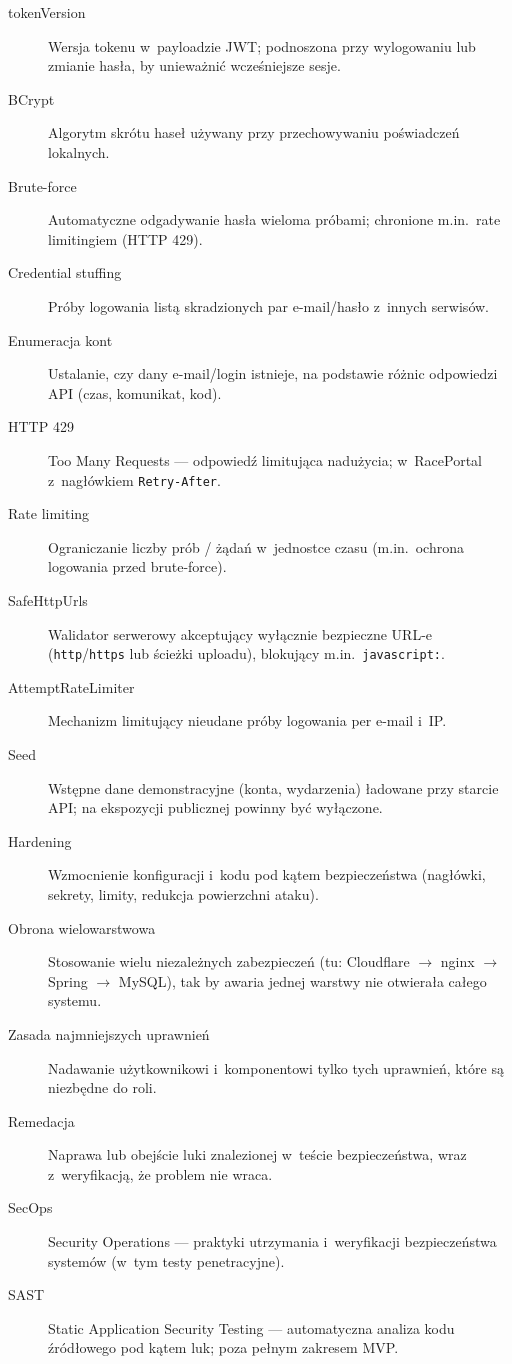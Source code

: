 \documentclass{sprz}
\begin{document}
\begin{description}
  \item[tokenVersion] Wersja tokenu w~payloadzie JWT; podnoszona przy wylogowaniu lub zmianie hasła, by unieważnić wcześniejsze sesje.
  \item[BCrypt] Algorytm skrótu haseł używany przy przechowywaniu poświadczeń lokalnych.
  \item[Brute-force] Automatyczne odgadywanie hasła wieloma próbami; chronione m.in.\ rate limitingiem (HTTP 429).
  \item[Credential stuffing] Próby logowania listą skradzionych par e-mail/hasło z~innych serwisów.
  \item[Enumeracja kont] Ustalanie, czy dany e-mail/login istnieje, na podstawie różnic odpowiedzi API (czas, komunikat, kod).
  \item[HTTP 429] Too Many Requests --- odpowiedź limitująca nadużycia; w~RacePortal z~nagłówkiem \texttt{Retry-After}.
  \item[Rate limiting] Ograniczanie liczby prób / żądań w~jednostce czasu (m.in.\ ochrona logowania przed brute-force).
  \item[SafeHttpUrls] Walidator serwerowy akceptujący wyłącznie bezpieczne URL-e (\texttt{http}/\texttt{https} lub ścieżki uploadu), blokujący m.in.\ \texttt{javascript:}.
  \item[AttemptRateLimiter] Mechanizm limitujący nieudane próby logowania per e-mail i~IP.
  \item[Seed] Wstępne dane demonstracyjne (konta, wydarzenia) ładowane przy starcie API; na ekspozycji publicznej powinny być wyłączone.
  \item[Hardening] Wzmocnienie konfiguracji i~kodu pod kątem bezpieczeństwa (nagłówki, sekrety, limity, redukcja powierzchni ataku).
  \item[Obrona wielowarstwowa] Stosowanie wielu niezależnych zabezpieczeń (tu: Cloudflare $\rightarrow$ nginx $\rightarrow$ Spring $\rightarrow$ MySQL), tak by awaria jednej warstwy nie otwierała całego systemu.
  \item[Zasada najmniejszych uprawnień] Nadawanie użytkownikowi i~komponentowi tylko tych uprawnień, które są niezbędne do roli.
  \item[Remedacja] Naprawa lub obejście luki znalezionej w~teście bezpieczeństwa, wraz z~weryfikacją, że problem nie wraca.
  \item[SecOps] Security Operations --- praktyki utrzymania i~weryfikacji bezpieczeństwa systemów (w~tym testy penetracyjne).
  \item[SAST] Static Application Security Testing --- automatyczna analiza kodu źródłowego pod kątem luk; poza pełnym zakresem MVP.

\end{description}
\end{document}
